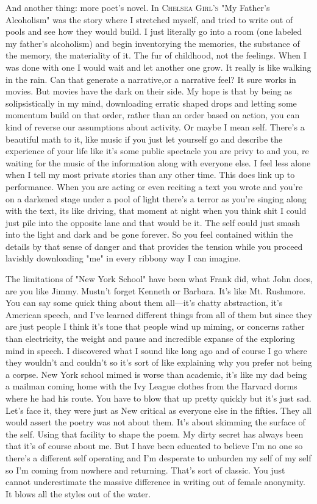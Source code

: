 \documentclass[
]{memoir}
\newlength{\drop}%
\begin{document}
And another thing: more poet's novel. In \textsc{Chelsea Girl's} "My
Father's Alcoholism" was the story where I stretched myself, and tried
to write out of pools and see how they would build. I just literally go
into a room (one labeled my father's alcoholism) and begin inventorying
the memories, the substance of the memory, the materiality of it. The
fur of childhood, not the feelings. When I was done with one I would
wait and let another one grow. It really is like walking in the rain.
Can that generate a narrative,or a narrative feel? It sure works in
movies. But movies have the dark on their side. My hope is that by being
as solipsistically in my mind, downloading erratic shaped drops and
letting some momentum build on that order, rather than an order based on
action, you can kind of reverse our assumptions about activity. Or maybe
I mean self. There's a beautiful math to it, like music if you just let
yourself go and describe the experience of your life like it's some
public spectacle you are privy to and you‚ re waiting for the music of
the information along with everyone else. I feel less alone when I tell
my most private stories than any other time. This does link up to
performance. When you are acting or even reciting a text you wrote and
you're on a darkened stage under a pool of light there's a terror as
you're singing along with the text, its like driving, that moment at
night when you think shit I could just pile into the opposite lane and
that would be it. The self could just smash into the light and dark and
be gone forever. So you feel contained within the details by that sense
of danger and that provides the tension while you proceed lavishly
downloading "me" in every ribbony way I can imagine.

The limitations of "New York School" have been what Frank did, what John
does, are you like Jimmy. Mustn't forget Kenneth or Barbara. It's like
Mt. Rushmore. You can say some quick thing about them all---it's chatty
abstraction, it's American speech, and I've learned different things
from all of them but since they are just people I think it's tone that
people wind up miming, or concerns rather than electricity, the weight
and pause and incredible expanse of the exploring mind in speech. I
discovered what I sound like long ago and of course I go where they
wouldn't and couldn't so it's sort of like explaining why you prefer not
being a corpse. New York school mimed is worse than academic, it's like
my dad being a mailman coming home with the Ivy League clothes from the
Harvard dorms where he had his route. You have to blow that up pretty
quickly but it's just sad. Let's face it, they were just as New critical
as everyone else in the fifties. They all would assert the poetry was
not about them. It's about skimming the surface of the self. Using that
facility to shape the poem. My dirty secret has always been that it's of
course about me. But I have been educated to believe I'm no one so
there's a different self operating and I'm desperate to unburden my self
of my self so I'm coming from nowhere and returning. That's sort of
classic. You just cannot underestimate the massive difference in writing
out of female anonymity. It blows all the styles out of the water.
\end{document}
